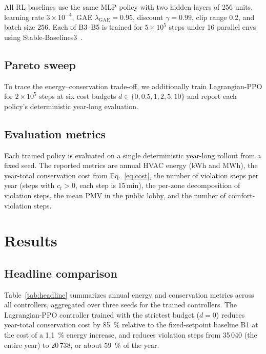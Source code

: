 All RL baselines use the same MLP policy with two hidden layers of
256 units, learning rate $3\times 10^{-4}$, GAE
$\lambda_{\mathrm{GAE}}=0.95$, discount $\gamma=0.99$, clip range
$0.2$, and batch size $256$. Each of B3--B5 is trained for
$5\times 10^{5}$ steps under 16 parallel envs using
Stable-Baselines3~\citep{raffin2021sb3}.

\subsection{Pareto sweep}

To trace the energy--conservation trade-off, we additionally train
Lagrangian-PPO for $2\times 10^{5}$ steps at six cost budgets
$d\in\{0,0.5,1,2,5,10\}$ and report each policy's deterministic
year-long evaluation.

\subsection{Evaluation metrics}\label{sec:metrics}

Each trained policy is evaluated on a single deterministic year-long
rollout from a fixed seed. The reported metrics are annual HVAC energy
(kWh and MWh), the year-total conservation cost from
Eq.~\eqref{eq:cost}, the number of violation steps per year (steps
with $c_t>0$, each step is 15\,min), the per-zone decomposition of
violation steps, the mean PMV in the public lobby, and the number of
comfort-violation steps.

\section{Results}\label{sec:results}

\subsection{Headline comparison}

Table~\ref{tab:headline} summarizes annual energy and conservation
metrics across all controllers, aggregated over three seeds for the
trained controllers. The Lagrangian-PPO controller trained with the
strictest budget ($d=0$) reduces year-total conservation cost by
\SI{85}{\percent} relative to the fixed-setpoint baseline B1 at the
cost of a \SI{1.1}{\percent} energy increase, and reduces violation
steps from 35\,040 (the entire year) to 20\,738, or about
\SI{59}{\percent} of the year.

